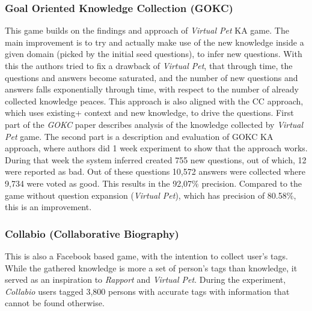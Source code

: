 \subsubsection{Goal Oriented Knowledge Collection (GOKC)}
\label{section:r:gokc}
This game builds on the
findings and approach of \emph{Virtual Pet} KA game. The main improvement
is to try and actually make use of the new knowledge inside a given domain
(picked by the initial seed questions), to infer new questions. With this
the authors tried to fix a drawback of \emph{Virtual Pet}, that through
time, the questions and answers become saturated, and the number of new
questions and answers falls exponentially through time, with respect
to the number of already collected knowledge peaces.
This approach is also aligned with the CC approach, which uses existing+
context and new knowledge, to drive the questions. First part of the \emph{GOKC}
paper describes analysis of the knowledge collected by \emph{Virtual Pet} game. 
The second part is a description and evaluation of  GOKC KA approach, where 
authors did 1 week experiment to show that the approach works. During that 
week the system inferred created 755 new questions, out of which, 12 were
reported as bad. Out of these questions 10,572 answers were collected where
9,734 were voted as good. This results in the 92,07\% precision. Compared
to the game without question expansion (\emph{Virtual Pet}), which has
precision of 80.58\%, this is an improvement.

\subsubsection{Collabio (Collaborative Biography)}
\label{section:r:collabio}
This is also a Facebook based game, with the intention to
collect user's tags. While the gathered knowledge is more a set of person's 
tags than knowledge, it served as an inspiration to \emph{Rapport} and 
\emph{Virtual Pet}. During the experiment, \emph{Collabio} users tagged
3,800 persons with accurate tags with information that cannot be found 
otherwise\parencite{Bernstein2009, Bernstein2010}.

